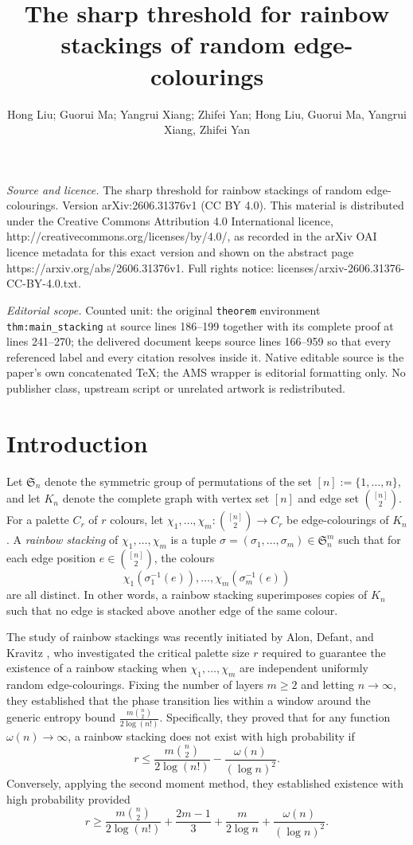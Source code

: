 \documentclass[10pt,a4paper]{amsart}
\renewcommand\le{\leqslant}
\renewcommand\ge{\geqslant}
\renewcommand\to{\rightarrow}
\begin{document}
\title[The sharp threshold for rainbow stackings of random edge-col]{The sharp threshold for rainbow stackings of random edge-colourings}
\author{Hong Liu; Guorui Ma; Yangrui Xiang; Zhifei Yan; Hong Liu, Guorui Ma, Yangrui Xiang, Zhifei Yan}
\date{}
\maketitle
\noindent\emph{Source and licence.} The sharp threshold for rainbow stackings of random edge-colourings. Version arXiv:2606.31376v1 (CC BY 4.0). This material is distributed under the Creative Commons Attribution 4.0 International licence, http://creativecommons.org/licenses/by/4.0/, as recorded in the arXiv OAI licence metadata for this exact version and shown on the abstract page https://arxiv.org/abs/2606.31376v1. Full rights notice: licenses/arxiv-2606.31376-CC-BY-4.0.txt.\par\smallskip
\noindent\textit{Editorial scope.} Counted unit: the original \texttt{theorem} environment \texttt{thm:main\_stacking} at source lines 186--199 together with its complete proof at lines 241--270; the delivered document keeps source lines 166--959 so that every referenced label and every citation resolves inside it. Native editable source is the paper's own concatenated TeX; the AMS wrapper is editorial formatting only. No publisher class, upstream script or unrelated artwork is redistributed.
\section{Introduction}
Let $\mathfrak{S}_{n}$ denote the symmetric group of permutations of the set $[n] := \{1, \dots, n\}$, and let $K_{n}$ denote the complete graph with vertex set $[n]$ and edge set $\binom{[n]}{2}$. For a palette $C_r$ of $r$ colours, let $\chi_{1}, \dots, \chi_{m} : \binom{[n]}{2} \to C_r$ be edge-colourings of $K_{n}$. A \emph{rainbow stacking} of $\chi_{1}, \dots, \chi_{m}$ is a tuple $\sigma = (\sigma_{1}, \dots, \sigma_{m}) \in \mathfrak{S}_{n}^{m}$ such that for each edge position $e \in \binom{[n]}{2}$, the colours
\[ \chi_{1}(\sigma_{1}^{-1}(e)), \dots, \chi_{m}(\sigma_{m}^{-1}(e)) \]
are all distinct. In other words, a rainbow stacking superimposes copies of $K_n$ such that no edge is stacked above another edge of the same colour.

The study of rainbow stackings was recently initiated by Alon, Defant, and Kravitz \cite{ADK}, who investigated the critical palette size $r$ required to guarantee the existence of a rainbow stacking when $\chi_{1}, \dots, \chi_{m}$ are independent uniformly random edge-colourings. Fixing the number of layers $m \ge 2$ and letting $n \to \infty$, they established that the phase transition lies within a window around the generic entropy bound $\frac{m\binom{n}{2}}{2\log(n!)}$.
Specifically, they proved that for any function $\omega(n) \to \infty$, a rainbow stacking does not exist with high probability if 
$$r \le \frac{m\binom{n}{2}}{2\log(n!)} - \frac{\omega(n)}{(\log n)^{2}}.$$
Conversely, applying the second moment method, they established existence with high probability provided
\[ r \ge \frac{m\binom{n}{2}}{2\log(n!)} + \frac{2m-1}{3} + \frac{m}{2\log n} + \frac{\omega(n)}{(\log n)^{2}}. \]
\end{document}

